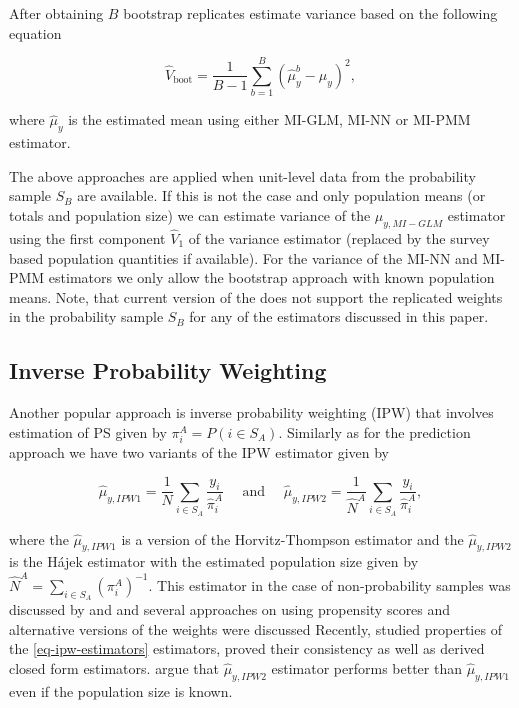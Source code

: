\documentclass[
]{jss}
\begin{document}
After obtaining \(B\) bootstrap replicates estimate variance based on
the following equation

\begin{equation}
\hat{V}_{\text{boot}} = \frac{1}{B-1}\sum_{b=1}^B\left(\hat{\mu}^b_y - \hat{\mu}_y\right)^2,
\label{eq-var-bootstrap}
\end{equation}

where \(\hat{\mu}_y\) is the estimated mean using either MI-GLM, MI-NN
or MI-PMM estimator.

The above approaches are applied when unit-level data from the
probability sample \(S_B\) are available. If this is not the case and
only population means (or totals and population size) we can estimate
variance of the \(\mu_{y,MI-GLM}\) estimator using the first component
\(\hat{V}_1\) of the \citet{kim_combining_2021} variance estimator
(replaced by the survey based population quantities if available). For
the variance of the MI-NN and MI-PMM estimators we only allow the
bootstrap approach with known population means. Note, that current
version of the  does not support the replicated weights
in the probability sample \(S_B\) for any of the estimators discussed in
this paper.

\subsection{Inverse Probability Weighting}\label{sec-ipw}

Another popular approach is inverse probability weighting (IPW) that
involves estimation of PS given by \(\pi_i^A=P\left(i \in S_A \right)\).
Similarly as for the prediction approach we have two variants of the IPW
estimator given by

\begin{equation}
\hat{\mu}_{y,IPW1}=\frac{1}{N} \sum_{i \in S_A} \frac{y_i}{\hat{\pi}_i^A} \quad \text { and } \quad \hat{\mu}_{y,IPW2}=\frac{1}{\hat{N}^A} \sum_{i \in S_A} \frac{y_i}{\hat{\pi}_i^A},
\label{eq-ipw-estimators}
\end{equation}

where the \(\hat{\mu}_{y,IPW1}\) is a version of the Horvitz-Thompson
estimator and the \(\hat{\mu}_{y,IPW2}\) is the Hájek estimator with the
estimated population size given by
\(\hat{N}^A = \sum_{i \in S_A} (\pi_i^A)^{-1}\). This estimator in the
case of non-probability samples was discussed by
\citet{lee2006propensity} and
\citet[chapter 13]{biffignandi2021handbook} and several approaches on
using propensity scores and alternative versions of the weights were
discussed \citep[cf.][section 3]{elliott_inference_2017} Recently,
\citet{chen2020doubly} studied properties of the
\eqref{eq-ipw-estimators} estimators, proved their consistency as well
as derived closed form estimators.
\citet[section 4.2]{wu2022statistical} argue that \(\hat{\mu}_{y,IPW2}\)
estimator performs better than \(\hat{\mu}_{y,IPW1}\) even if the
population size is known.
\end{document}
